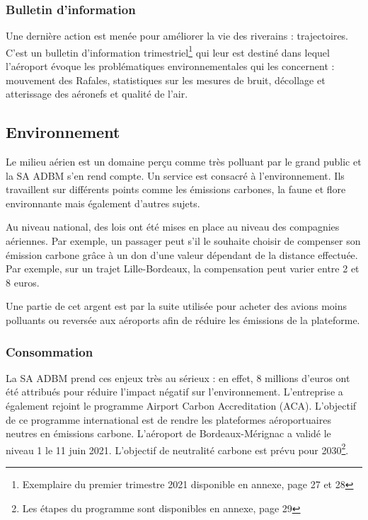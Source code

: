 \subsubsection{Bulletin d'information}

Une dernière action est menée pour améliorer la vie des riverains : trajectoires. C'est un bulletin d'information trimestriel\footnote{Exemplaire du premier trimestre 2021 disponible en annexe, page 27 et 28} qui leur est destiné dans lequel l'aéroport évoque les problématiques environnementales qui les concernent : mouvement des Rafales, statistiques sur les mesures de bruit, décollage et atterissage des aéronefs et qualité de l'air.


\subsection{Environnement}

Le milieu aérien est un domaine perçu comme très polluant par le grand public et la SA ADBM s'en rend compte. Un service est consacré à l'environnement. Ils travaillent sur différents points comme les émissions carbones, la faune et flore environnante mais également d'autres sujets.


Au niveau national, des lois ont été mises en place au niveau des compagnies aériennes. Par exemple, un passager peut s'il le souhaite choisir de compenser son émission carbone grâce à un don d'une valeur dépendant de la distance effectuée. Par exemple, sur un trajet Lille-Bordeaux, la compensation peut varier entre 2 et 8 euros.

Une partie de cet argent est par la suite utilisée pour acheter des avions moins polluants ou reversée aux aéroports afin de réduire les émissions de la plateforme.

\subsubsection{Consommation}

La SA ADBM prend ces enjeux très au sérieux : en effet, 8 millions d'euros ont été attribués pour réduire l'impact négatif sur l'environnement.
L'entreprise a également rejoint le programme Airport Carbon Accreditation (ACA). L'objectif de ce programme international est de rendre les plateformes aéroportuaires neutres en émissions carbone.
L'aéroport de Bordeaux-Mérignac a validé le niveau 1 le 11 juin 2021. L'objectif de neutralité carbone est prévu pour 2030\footnote{Les étapes du programme sont disponibles en annexe, page 29}.

